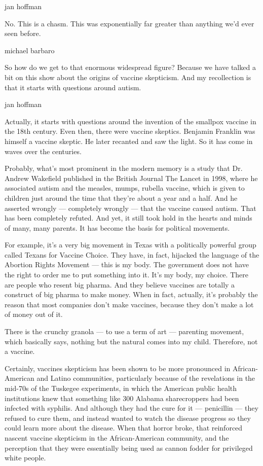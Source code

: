 jan hoffman

No. This is a chasm. This was exponentially far greater than anything
we'd ever seen before.

michael barbaro

So how do we get to that enormous widespread figure? Because we have
talked a bit on this show about the origins of vaccine skepticism. And
my recollection is that it starts with questions around autism.

jan hoffman

Actually, it starts with questions around the invention of the smallpox
vaccine in the 18th century. Even then, there were vaccine skeptics.
Benjamin Franklin was himself a vaccine skeptic. He later recanted and
saw the light. So it has come in waves over the centuries.

Probably, what's most prominent in the modern memory is a study that Dr.
Andrew Wakefield published in the British Journal The Lancet in 1998,
where he associated autism and the measles, mumps, rubella vaccine,
which is given to children just around the time that they're about a
year and a half. And he asserted wrongly --- completely wrongly --- that
the vaccine caused autism. That has been completely refuted. And yet, it
still took hold in the hearts and minds of many, many parents. It has
become the basis for political movements.

For example, it's a very big movement in Texas with a politically
powerful group called Texans for Vaccine Choice. They have, in fact,
hijacked the language of the Abortion Rights Movement --- this is my
body. The government does not have the right to order me to put
something into it. It's my body, my choice. There are people who resent
big pharma. And they believe vaccines are totally a construct of big
pharma to make money. When in fact, actually, it's probably the reason
that most companies don't make vaccines, because they don't make a lot
of money out of it.

There is the crunchy granola --- to use a term of art --- parenting
movement, which basically says, nothing but the natural comes into my
child. Therefore, not a vaccine.

Certainly, vaccines skepticism has been shown to be more pronounced in
African-American and Latino communities, particularly because of the
revelations in the mid-70s of the Tuskegee experiments, in which the
American public health institutions knew that something like 300 Alabama
sharecroppers had been infected with syphilis. And although they had the
cure for it --- penicillin --- they refused to cure them, and instead
wanted to watch the disease progress so they could learn more about the
disease. When that horror broke, that reinforced nascent vaccine
skepticism in the African-American community, and the perception that
they were essentially being used as cannon fodder for privileged white
people.

